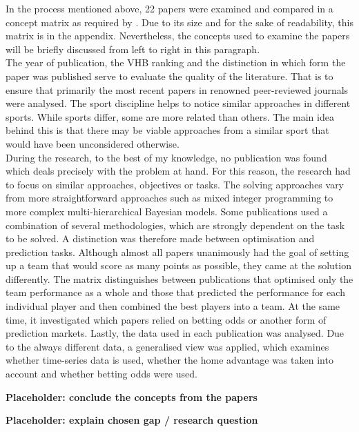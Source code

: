 In the process mentioned above, 22 papers were examined and compared in a concept matrix as required by \citeauthor{webster_guest_2002}. Due to its size and for the sake of readability, this matrix is in the appendix. Nevertheless, the concepts used to examine the papers will be briefly discussed from left to right in this paragraph. \\
\indent The year of publication, the VHB ranking and the distinction in which form the paper was published serve to evaluate the quality of the literature. That is to ensure that primarily the most recent papers in renowned peer-reviewed journals were analysed. The sport discipline helps to notice similar approaches in different sports. While sports differ, some are more related than others. The main idea behind this is that there may be viable approaches from a similar sport that would have been unconsidered otherwise.  \\
\indent During the research, to the best of my knowledge, no publication was found which deals precisely with the problem at hand. For this reason, the research had to focus on similar approaches, objectives or tasks. The solving approaches vary from more straightforward approaches such as mixed integer programming to more complex multi-hierarchical Bayesian models. Some publications used a combination of several methodologies, which are strongly dependent on the task to be solved. A distinction was therefore made between optimisation and prediction tasks. Although almost all papers unanimously had the goal of setting up a team that would score as many points as possible, they came at the solution differently. The matrix distinguishes between publications that optimised only the team performance as a whole and those that predicted the performance for each individual player and then combined the best players into a team. At the same time, it investigated which papers relied on betting odds or another form of prediction markets. Lastly, the data used in each publication was analysed. Due to the always different data, a generalised view was applied, which examines whether time-series data is used, whether the home advantage was taken into account and whether betting odds were used.

\textbf{Placeholder: conclude the concepts from the papers}

\textbf{Placeholder: explain chosen gap / research question }



